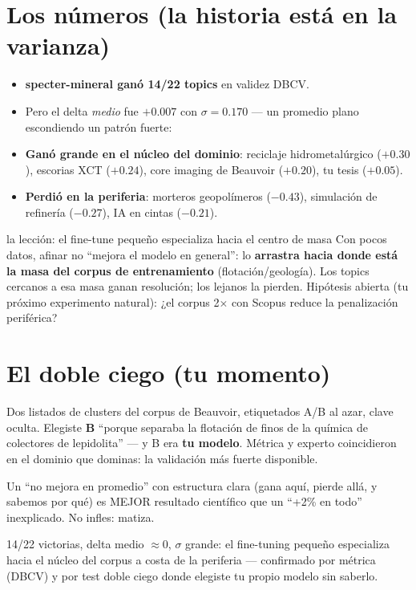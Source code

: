 \documentclass[11pt,a4paper]{article}
\begin{document}
\section{Los números (la historia está en la varianza)}

\begin{itemize}
  \item \textbf{specter-mineral ganó 14/22 topics} en validez DBCV.
  \item Pero el delta \emph{medio} fue $+0.007$ con $\sigma = 0.170$ — un promedio plano
        escondiendo un patrón fuerte:
  \item \textbf{Ganó grande en el núcleo del dominio}: reciclaje hidrometalúrgico ($+0.30$),
        escorias XCT ($+0.24$), core imaging de Beauvoir ($+0.20$), tu tesis ($+0.05$).
  \item \textbf{Perdió en la periferia}: morteros geopolímeros ($-0.43$), simulación de
        refinería ($-0.27$), IA en cintas ($-0.21$).
\end{itemize}

\begin{concepto}{la lección: el fine-tune pequeño especializa hacia el centro de masa}
Con pocos datos, afinar no ``mejora el modelo en general'': lo \textbf{arrastra hacia donde
está la masa del corpus de entrenamiento} (flotación/geología). Los topics cercanos a esa
masa ganan resolución; los lejanos la pierden. Hipótesis abierta (tu próximo experimento
natural): ¿el corpus 2$\times$ con Scopus reduce la penalización periférica?
\end{concepto}

\section{El doble ciego (tu momento)}

Dos listados de clusters del corpus de Beauvoir, etiquetados A/B al azar, clave oculta.
Elegiste \textbf{B} ``porque separaba la flotación de finos de la química de colectores de
lepidolita'' --- y B era \textbf{tu modelo}. Métrica y experto coincidieron en el dominio
que dominas: la validación más fuerte disponible.

\begin{ojo}
Un ``no mejora en promedio'' con estructura clara (gana aquí, pierde allá, y sabemos por
qué) es MEJOR resultado científico que un ``+2\% en todo'' inexplicado. No infles: matiza.
\end{ojo}

\begin{resumen}
14/22 victorias, delta medio $\approx 0$, $\sigma$ grande: el fine-tuning pequeño
especializa hacia el núcleo del corpus a costa de la periferia — confirmado por métrica
(DBCV) y por test doble ciego donde elegiste tu propio modelo sin saberlo.
\end{resumen}
\clearpage
{}
{}
\end{document}
